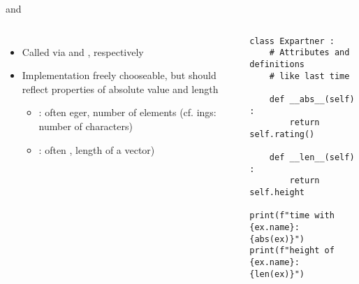 
\begin{frame}[fragile]{ and }
%
\begin{columns}[T]
\begin{itemize}
\item Called via  and , respectively
\item Implementation freely chooseable, but should reflect properties of absolute value and length
	\begin{itemize}
	\item {}: often eger, number of elements (cf. ings: number of characters)
	\item {}: often , length of a vector)
	\end{itemize} 
\end{itemize}
%
\vspace{-6pt}
\begin{codebox}
\begin{verbatim}
class Expartner :
    # Attributes and definitions
    # like last time
    
    def __abs__(self) :
        return self.rating()
    
    def __len__(self) :
        return self.height

print(f"time with {ex.name}: {abs(ex)}")
print(f"height of {ex.name}: {len(ex)}")
\end{verbatim}
\end{codebox}
\end{columns}
%
\end{frame}


